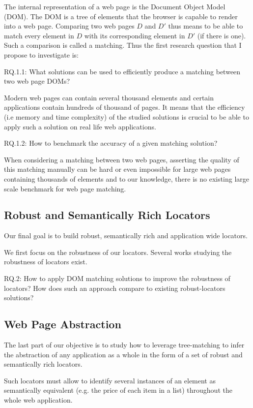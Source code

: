 The internal representation of a web page is the Document Object Model (DOM). The DOM is a tree of elements that the browser is capable to render into a web page.
Comparing two web pages $D$ and $D'$ thus means to be able to match every element in $D$ with its corresponding element in $D'$ (if there is one). Such a comparison is called a matching.
Thus the first research question that I propose to investigate is:

RQ.1.1: What solutions can be used to efficiently produce a matching between two web page DOMs?

Modern web pages can contain several thousand elements and certain applications contain hundreds of thousand of pages. It means that the efficiency (i.e memory and time complexity) of the studied solutions is crucial to be able to apply such a solution on real life web applications.

RQ.1.2: How to benchmark the accuracy of a given matching solution?

When considering a matching between two web pages, asserting the quality of this matching manually can be hard or even impossible for large web pages containing thousands of elements and to our knowledge, there is no existing large scale benchmark for web page matching.

\subsection{Robust and Semantically Rich Locators}
Our final goal is to build robust, semantically rich and application wide locators.

We first focus on the robustness of our locators. 
Several works studying the robustness of locators exist.

RQ.2: How to apply DOM matching solutions to improve the robustness of locators? How does such an approach compare to existing robust-locators solutions?

\subsection{Web Page Abstraction}
The last part of our objective is to study how to leverage tree-matching to infer the abstraction of any application as a whole in the form of a set of robust and semantically rich locators.

Such locators must allow to identify several instances of an element as semantically equivalent (e.g. the price of each item in a list) throughout the whole web application.

